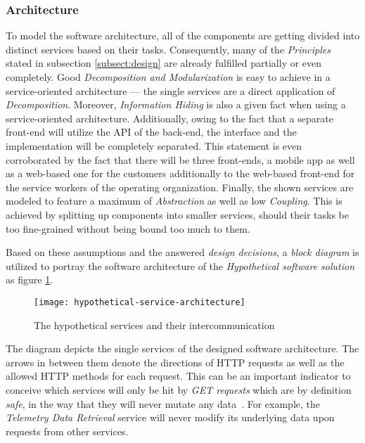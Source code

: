 \documentclass[12pt,a4paper,twoside]{report}
\begin{document}
\subsubsection{Architecture}

To model the software architecture, all of the components are getting divided
into distinct services based on their tasks. Consequently, many of the
\textit{Principles} stated in subsection \ref{subsect:design} are already fulfilled
partially or even completely. Good \textit{Decomposition and Modularization} is
easy to achieve in a service-oriented architecture --- the single services
are a direct application of \textit{Decomposition}.
Moreover, \textit{Information Hiding} is also a given fact when using a
service-oriented architecture.
Additionally, owing to the fact that a separate front-end will utilize the API
of the back-end, the interface and the implementation will be completely separated.
This statement is even corroborated by the fact that there will be three front-ends,
a mobile app as well as a web-based one for the customers additionally to the
web-based front-end for the service workers of the operating organization.
Finally, the shown services are modeled to feature a maximum of \textit{Abstraction}
as well as low \textit{Coupling}. This is achieved by splitting up components
into smaller services, should their tasks be too fine-grained without being
bound too much to them.

Based on these assumptions and the answered \textit{design decisions},
a \textit{block diagram} is utilized to portray the software architecture of the
\textit{Hypothetical software solution} as figure \ref{fig:hypothetical-service-architecture}.\\

\begin{figure}[htbp]
\centering
\texttt{[image: hypothetical-service-architecture]}
\caption{The hypothetical services and their intercommunication}
\label{fig:hypothetical-service-architecture}
\end{figure}

The diagram depicts the single services of the designed software architecture.
The arrows in between them denote the directions of HTTP requests as well
as the allowed HTTP methods for each request.
This can be an important indicator to conceive which services
will only be hit by \textit{GET requests} which are by definition \textit{safe},
in the way that they will never mutate any data~\cite{http-rfc}.
For example, the \textit{Telemetry Data Retrieval} service will never modify
its underlying data upon requests from other services.
\end{document}

